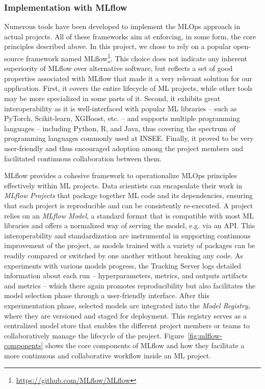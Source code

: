 \documentclass[graybox]{svmult}
\begin{document}
\subsubsection{Implementation with MLflow}

Numerous tools have been developed to implement the MLOps approach in actual projects. All of these frameworks aim at enforcing, in some form, the core principles described above. In this project, we chose to rely on a popular open-source framework named MLflow\footnote{\url{https://github.com/MLflow/MLflow}}. This choice does not indicate any inherent superiority of MLflow over alternative software, but reflects a set of good properties associated with MLflow that made it a very relevant solution for our application. First, it covers the entire lifecycle of ML projects, while other tools may be more specialized in some parts of it. Second, it exhibits great interoperability as it is well-interfaced with popular ML libraries -- such as PyTorch, Scikit-learn, XGBoost, etc. -- and supports multiple programming languages -- including Python, R, and Java, thus covering the spectrum of programming languages commonly used at INSEE. Finally, it proved to be very user-friendly and thus encouraged adoption among the project members and facilitated continuous collaboration between them.

MLflow provides a cohesive framework to operationalize MLOps principles effectively within ML projects. Data scientists can encapsulate their work in \emph{MLflow Projects} that package together ML code and its dependencies, ensuring that each project is reproducible and can be consistently re-executed. A project relies on an \emph{MLflow Model}, a standard format that is compatible with most ML libraries and offers a normalized way of serving the model, e.g. via an API. This interoperability and standardization are instrumental in supporting continuous improvement of the project, as models trained with a variety of packages can be readily compared or switched by one another without breaking any code. As experiments with various models progress, the Tracking Server logs detailed information about each run -- hyperparameters, metrics, and outputs artifacts and metrics -- which there again promotes reproducibility but also facilitates the model selection phase through a user-friendly interface. After this experimentation phase, selected models are integrated into the \emph{Model Registry}, where they are versioned and staged for deployment. This registry serves as a centralized model store that enables the different project members or teams to collaboratively manage the lifecycle of the project. Figure~\ref{fig:mlflow-components} shows the core components of MLflow and how they facilitate a more continuous and collaborative workflow inside an ML project.
\end{document}
